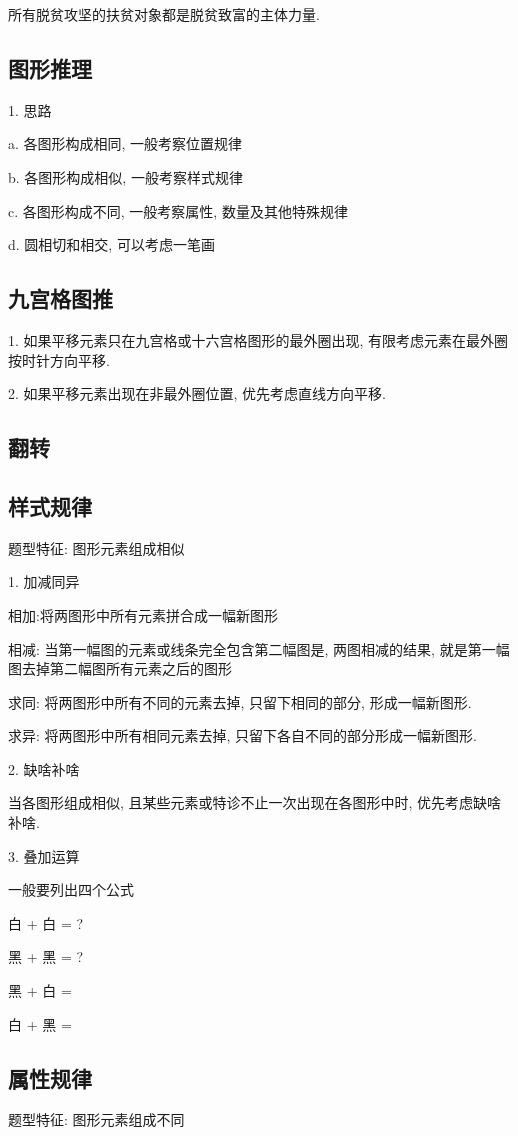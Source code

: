 \documentclass[UTF8]{ctexart}
\begin{document}
所有脱贫攻坚的扶贫对象都是脱贫致富的主体力量.

\subsection{图形推理}

1. 思路

a. 各图形构成相同, 一般考察位置规律

b. 各图形构成相似, 一般考察样式规律

c. 各图形构成不同, 一般考察属性, 数量及其他特殊规律

d. 圆相切和相交, 可以考虑一笔画

\subsection{九宫格图推}
1. 如果平移元素只在九宫格或十六宫格图形的最外圈出现, 有限考虑元素在最外圈按时针方向平移.

2. 如果平移元素出现在非最外圈位置, 优先考虑直线方向平移.

\subsection{翻转}

\subsection{样式规律}
题型特征: 图形元素组成相似

1. 加减同异

相加:将两图形中所有元素拼合成一幅新图形

相减: 当第一幅图的元素或线条完全包含第二幅图是, 两图相减的结果, 就是第一幅图去掉第二幅图所有元素之后的图形

求同: 将两图形中所有不同的元素去掉, 只留下相同的部分, 形成一幅新图形.

求异: 将两图形中所有相同元素去掉, 只留下各自不同的部分形成一幅新图形.


2. 缺啥补啥

当各图形组成相似, 且某些元素或特诊不止一次出现在各图形中时, 优先考虑缺啥补啥.


3. 叠加运算

一般要列出四个公式

白 + 白 = ?

黑 + 黑 = ?

黑 + 白 =

白 + 黑 =

\subsection{属性规律}
题型特征: 图形元素组成不同
\end{document}
